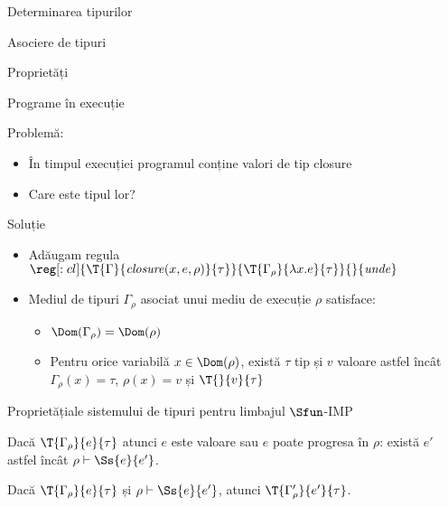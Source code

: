 \documentclass[xcolor=x11names,compress,10pt]{beamer}
\begin{document}
\begin{section}{Determinarea tipurilor}
\begin{subsection}{Asociere de tipuri}
    \end{subsection}
    
    \begin{subsection}{Proprietăți}
    
    \begin{frame}{Programe în execuție}
     \begin{alertblock}{Problemă:}
     \begin{itemize}
       \item În timpul execuției programul conține valori de tip closure
       \item Care este tipul lor?
     \end{itemize}
     \end{alertblock} 
    
     \begin{block}{Soluție}
     \begin{itemize}
     \item Adăugam regula $\reg[:cl]{\T{\Gamma}{{\it closure}(x, e, \rho)}{\tau}}{\T{\Gamma_\rho}{\lambda x. e}{\tau}}{} {\it unde}$ 
     \item Mediul de tipuri $\Gamma_\rho$ asociat unui mediu de execuție $\rho$ satisface:
     \begin{itemize}
     \item $\Dom(\Gamma_\rho) = \Dom(\rho)$
     \item Pentru orice variabilă $x\in \Dom(\rho)$, există $\tau$ tip și $v$ valoare astfel încât $\Gamma_\rho(x) = \tau$, $\rho(x) = v$ și $\T{}{v}{\tau}$
     \end{itemize}
     \end{itemize}
     \end{block}
    \end{frame}
    
    \begin{frame}{Proprietăți}{ale sistemului de tipuri pentru limbajul $\Sfun$-IMP}
    \begin{theorem} Dacă $\T{\Gamma_\rho}{e}{\tau}$ atunci $e$ este valoare sau $e$ poate progresa în $\rho$: există $e'$ astfel încât $\rho \vdash \Ss{e}{e'}$.
    \end{theorem}
    \vfill
    
    \begin{theorem}
    Dacă $\T{\Gamma_\rho}{e}{\tau}$ și $\rho\vdash \Ss{e}{e'}$, atunci 
    $\T{\Gamma_\rho'}{e'}{\tau}$.
    \end{theorem}
    

\end{frame}
\end{subsection}
\end{section}
\end{document}
